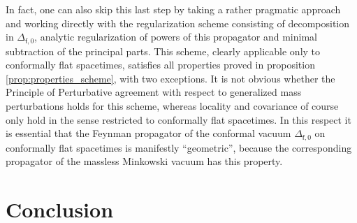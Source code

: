 \documentclass[11pt]{book}
\newcommand{\fsf}{\mathsf{f}}
\theoremstyle{break}
\begin{document}
In fact, one can also skip this last step by taking a rather pragmatic approach and working directly with the regularization scheme consisting of decomposition in $\Delta_{\fsf,0}$, analytic regularization of powers of this propagator and minimal subtraction of the principal parts. This scheme, clearly applicable only to conformally flat spacetimes, satisfies all properties proved in proposition \ref{prop:properties_scheme}, with two exceptions. It is not obvious whether the Principle of Perturbative agreement with respect to generalized mass perturbations holds for this scheme, whereas locality and covariance of course only hold in the sense restricted to conformally flat spacetimes. In this respect it is essential that the Feynman propagator of the conformal vacuum $\Delta_{\fsf,0}$ on conformally flat spacetimes is manifestly ``geometric'', because the corresponding propagator of the massless Minkowski vacuum has this property.



\chapter*{Conclusion}
\end{document}
